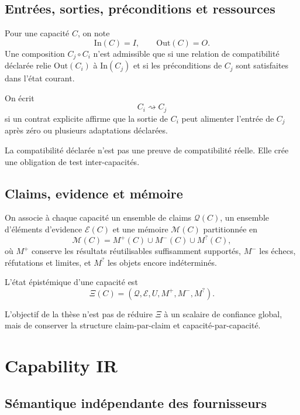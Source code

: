 \section{Entrées, sorties, préconditions et ressources}

Pour une capacité $C$, on note
\[
\mathrm{In}(C)=I,\qquad \mathrm{Out}(C)=O.
\]
Une composition $C_j\circ C_i$ n'est admissible que si une relation de compatibilité déclarée relie $\mathrm{Out}(C_i)$ à $\mathrm{In}(C_j)$ et si les préconditions de $C_j$ sont satisfaites dans l'état courant.

\begin{definition}
On écrit
\[
C_i\rightsquigarrow C_j
\]
si un contrat explicite affirme que la sortie de $C_i$ peut alimenter l'entrée de $C_j$ après zéro ou plusieurs adaptations déclarées.
\end{definition}

La compatibilité déclarée n'est pas une preuve de compatibilité réelle. Elle crée une obligation de test inter-capacités.

\section{Claims, evidence et mémoire}

On associe à chaque capacité un ensemble de claims $\mathcal Q(C)$, un ensemble d'éléments d'evidence $\mathcal E(C)$ et une mémoire $\mathcal M(C)$ partitionnée en
\[
\mathcal M(C)=M^+(C)\cup M^-(C)\cup M^?(C),
\]
où $M^+$ conserve les résultats réutilisables suffisamment supportés, $M^-$ les échecs, réfutations et limites, et $M^?$ les objets encore indéterminés.

\begin{definition}
L'état épistémique d'une capacité est
\[
\Xi(C)=(\mathcal Q,\mathcal E,U,M^+,M^-,M^?).
\]
\end{definition}

L'objectif de la thèse n'est pas de réduire $\Xi$ à un scalaire de confiance global, mais de conserver la structure claim-par-claim et capacité-par-capacité.

\chapter{Capability IR}

\section{Sémantique indépendante des fournisseurs}

